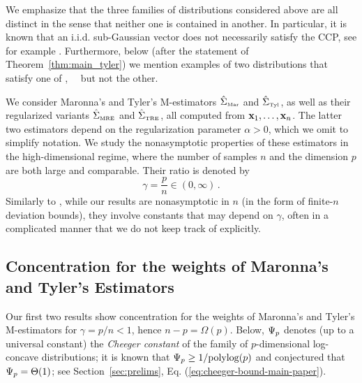 \documentclass[times,sort&compress,3p]{elsarticle}
\newcommand{\Revision}[1]{{#1}}
\begin{document}
\Revision{
\begin{remark}
     We emphasize that the three families of distributions considered above are all distinct in the sense that neither one is contained in another. In particular, it is known that an i.i.d. sub-Gaussian vector does not necessarily satisfy the CCP, see for example \cite{gozlan2018characterization,huang2021dimension}. Furthermore, below (after the statement of Theorem~\ref{thm:main_tyler}) we mention examples of two distributions that satisfy one of \AssumCCPSB,~\AssumLC~ but not the other.
\end{remark}
}

We consider Maronna's and Tyler's M-estimators $\hat{\Sigma}_{\mbox{\tiny{Mar}}}$ and $\hat{\Sigma}_{\mbox{\tiny{Tyl}}}$, as well as their regularized variants $\hat{\Sigma}_{\mbox{\tiny{MRE}}}$ and $\hat{\Sigma}_{\mbox{\tiny{TRE}}}$, all computed from ${\bf x}_1,\ldots,{\bf x}_n$.   
 The latter two estimators depend on the regularization parameter $\alpha>0$, which we omit to simplify notation. 
%
We study
the nonasymptotic properties of 
these estimators 
in the {high-dimensional regime}, where the number of samples $n$ and the dimension $p$ are both large and comparable. Their ratio is denoted by
\begin{equation}
    \gamma = 
    \frac{p}{n} \in (0,\infty) \,.
\end{equation}
Similarly to \cite{zhang2016marvcenko,goes2017robust}, while our results are nonasymptotic in $n$ (in the form of finite-$n$ deviation bounds), they involve constants that may depend on $\gamma$, often in a complicated manner that we do not keep track of explicitly. 

\subsection{Concentration for the weights of Maronna's and Tyler's Estimators}


Our first two results show concentration for the weights of Maronna's and Tyler's M-estimators
for
$\gamma=p/n < 1$, hence $n-p=\Omega(p)$.
Below, $\Psi_p$ denotes (up to a universal constant) the \emph{Cheeger constant} of the family of $p$-dimensional log-concave distributions; it is known that $\Psi_p\ge 1/\mathrm{polylog}(p)$ and conjectured that $\Psi_p=\Theta(1)$; see Section~\ref{sec:prelims}, Eq. (\ref{eq:cheeger-bound-main-paper}).
 
\end{document}
